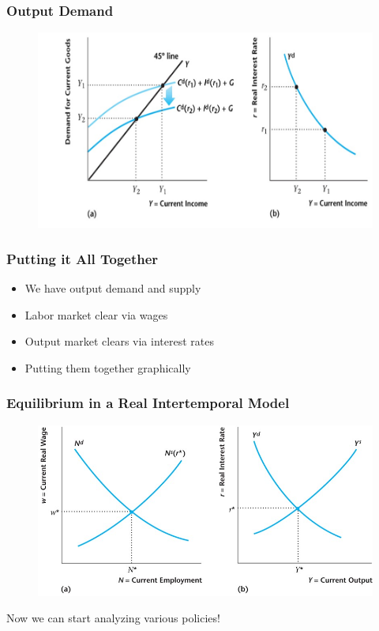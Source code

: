 \documentclass{beamer}
\begin{document}
\begin{frame}
\frametitle[alignment=center]{Output Demand} 
\begin{figure}
\centering
\includegraphics[scale=0.55]{Figures/W_Fig_11pt19.png}
\end{figure}
\end{frame}

\begin{frame}
\frametitle[alignment=center]{Putting it All Together} 
\begin{itemize}
\item We have output demand and supply
\bigskip
\item Labor market clear via wages
\bigskip
\item Output market clears via interest rates
\bigskip
\item Putting them together graphically
\end{itemize}
\end{frame}

\begin{frame}
\frametitle[alignment=center]{Equilibrium in a Real Intertemporal Model} 
\begin{figure}
\centering
\includegraphics[scale=0.52]{Figures/W_Fig_11pt21.png}
\end{figure}
Now we can start analyzing various policies!
\end{frame}
\end{document}
